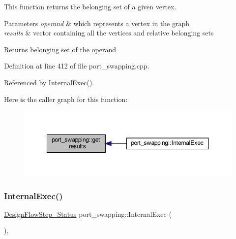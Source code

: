 This function returns the belonging set of a given vertex. 


\begin{DoxyParams}{Parameters}
{\em operand} & which represents a vertex in the graph \\
\hline
{\em results} & vector containing all the vertices and relative belonging sets \\
\hline
\end{DoxyParams}
\begin{DoxyReturn}{Returns}
belonging set of the operand 
\end{DoxyReturn}


Definition at line 412 of file port\+\_\+swapping.\+cpp.



Referenced by Internal\+Exec().

Here is the caller graph for this function\+:
\nopagebreak
\begin{figure}[H]
\begin{center}
\leavevmode
\includegraphics[width=350pt]{d6/d83/classport__swapping_a88d48f0586c1c2e0cfa54708f8b28fea_icgraph}
\end{center}
\end{figure}
\mbox{\label{classport__swapping_afb48fd23dc4e2bc8f38fe50a4cc9f0e5}} 
\subsubsection{\texorpdfstring{Internal\+Exec()}{InternalExec()}}
{\footnotesize\ttfamily \hyperlink{design__flow__step_8hpp_afb1f0d73069c26076b8d31dbc8ebecdf}{Design\+Flow\+Step\+\_\+\+Status} port\+\_\+swapping\+::\+Internal\+Exec (\begin{DoxyParamCaption}{ }\end{DoxyParamCaption})\hspace{0.3cm}{\ttfamily [override]}, {\ttfamily [virtual]}}



